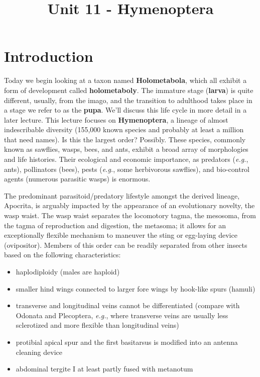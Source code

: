 \documentclass[letterpaper, 11pt]{article}
\title{Unit 11 - Hymenoptera}
\author{}
\begin{document}
\cleanlookdateon %
\maketitle
\thispagestyle{fancy}
\section*{Introduction}
Today we begin looking at a taxon named \textbf{Holometabola}, which all exhibit a form of development called \textbf{holometaboly}. The immature stage (\textbf{larva}) is quite different, usually, from the imago, and the transition to adulthood takes place in a stage we refer to as the \textbf{pupa}. We'll discuss this life cycle in more detail in a later lecture. This lecture focuses on \textbf{Hymenoptera}, a lineage of almost indescribable diversity (155,000 known species and probably at least a million that need names). Is this the largest order? Possibly. These species, commonly known as sawflies, wasps, bees, and ants, exhibit a broad array of morphologies and life histories. Their ecological and economic importance, as predators (\textit{e.g.}, ants), pollinators (bees), pests (\textit{e.g.}, some herbivorous sawflies), and bio-control agents (numerous parasitic wasps) is enormous. 

The predominant parasitoid/predatory lifestyle amongst the derived lineage, Apocrita, is arguably impacted by the appearance of an evolutionary novelty, the wasp waist. The wasp waist separates the locomotory tagma, the mesosoma, from the tagma of reproduction and digestion, the metasoma; it allows for an exceptionally flexible mechanism to maneuver the sting or egg-laying device (ovipositor). Members of this order can be readily separated from other insects based on the following characteristics:

\begin{itemize}
\item haplodiploidy (males are haploid)
\item smaller hind wings connected to larger fore wings by hook-like spurs (hamuli)
\item transverse and longitudinal veins cannot be differentiated (compare with Odonata and Plecoptera, \textit{e.g.}, where transverse veins are usually less sclerotized and more flexible than longitudinal veins)
\item protibial apical spur and the first basitarsus is modified into an antenna cleaning device
\item abdominal tergite I at least partly fused with metanotum
\end{itemize}
\end{document}
